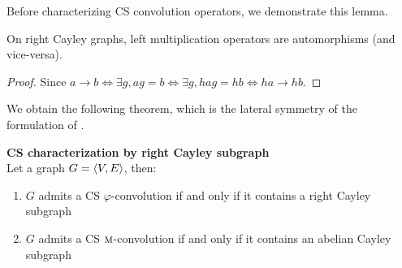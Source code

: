 Before characterizing CS convolution operators, we demonstrate this lemma.

\begin{lemma}
On right Cayley graphs, left multiplication operators are automorphisms (and vice-versa).
\label{lem:lat}
\end{lemma}
\begin{proof}
Since $a \rightarrow b \Leftrightarrow \exists g, ag = b \Leftrightarrow \exists g, hag = hb \Leftrightarrow ha \rightarrow hb$.
\end{proof}

We obtain the following theorem, which is the lateral symmetry of the formulation of .

\begin{theorem}\textbf{CS characterization by right Cayley subgraph}\\
Let a graph $G = \langle V, E \rangle$, then:
\begin{enumerate}[label=(\roman*)]
\item $G$ admits a CS $\varphi$-convolution if and only if it contains a right Cayley subgraph
\item $G$ admits a CS $\operatorname{\textsc{m}}$-convolution if and only if it contains an abelian Cayley subgraph
\end{enumerate}
\label{th:cscayleychar}
\end{theorem}

